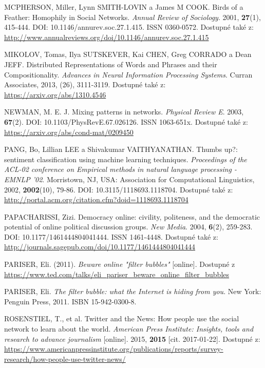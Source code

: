 \documentclass[12pt, a4paper]{article}
\numberwithin{equation}{section} 	%
\begin{document}
\begin{thebibliography}{99}
    MCPHERSON, Miller, Lynn SMITH-LOVIN a James M COOK. Birds of a Feather: Homophily in Social Networks. \textit{Annual Review of Sociology}. 2001, \textbf{27}(1), 415-444. DOI: 10.1146/annurev.soc.27.1.415. ISSN 0360-0572. Dostupné také z: \url{http://www.annualreviews.org/doi/10.1146/annurev.soc.27.1.415}

    MIKOLOV, Tomas, Ilya SUTSKEVER, Kai CHEN, Greg CORRADO a Dean JEFF. Distributed Representations of Words and Phrases and their Compositionality. \textit{Advances in Neural Information Processing Systems}. Curran Associates, 2013, (26), 3111-3119. Dostupné také z: \url{https://arxiv.org/abs/1310.4546}

    NEWMAN, M. E. J. Mixing patterns in networks. \textit{Physical Review E}. 2003, \textbf{67}(2). DOI: 10.1103/PhysRevE.67.026126. ISSN 1063-651x. Dostupné také z: \url{https://arxiv.org/abs/cond-mat/0209450}

    PANG, Bo, Lillian LEE a Shivakumar VAITHYANATHAN. Thumbs up?: sentiment classification using machine learning techniques. \textit{Proceedings of the ACL-02 conference on Empirical methods in natural language processing - EMNLP '02}. Morristown, NJ, USA: Association for Computational Linguistics, 2002, \textbf{2002}(10), 79-86. DOI: 10.3115/1118693.1118704. Dostupné také z: \url{http://portal.acm.org/citation.cfm?doid=1118693.1118704}

    PAPACHARISSI, Zizi. Democracy online: civility, politeness, and the democratic potential of online political discussion groups. \textit{New Media}. 2004, \textbf{6}(2), 259-283. DOI: 10.1177/1461444804041444. ISSN 1461-4448. Dostupné také z: \url{http://journals.sagepub.com/doi/10.1177/1461444804041444}

    PARISER, Eli. (2011). \textit{Beware online "filter bubbles"} [online]. Dostupné z \url{https://www.ted.com/talks/eli_pariser_beware_online_filter_bubbles}

    PARISER, Eli. \textit{The filter bubble: what the Internet is hiding from you}. New York: Penguin Press, 2011. ISBN 15-942-0300-8.

    ROSENSTIEL, T., et al. Twitter and the News: How people use the social network to learn about the world. \textit{American Press Institute: Insights, tools and research to advance journalism} [online]. 2015, \textbf{2015} [cit. 2017-01-22]. Dostupné z: \url{https://www.americanpressinstitute.org/publications/reports/survey-research/how-people-use-twitter-news/}


\end{thebibliography}
\end{document}
